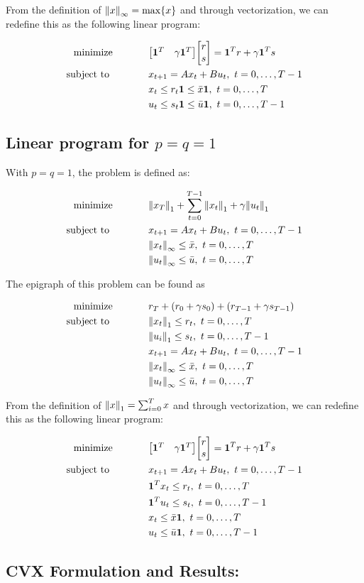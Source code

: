 \documentclass[letter]{article}
\newcommand{\optpblm}[3][eq:default]{
	\begin{equation}\label{#1}
		\begin{aligned}
			\text{minimize} \hspace{0.5in} &#2\vspace{5pt}\\
			\text{subject to \hspace{0.5in}} &#3
		\end{aligned}	
	\end{equation}
}
\begin{document}
From the definition of $\norm{x}_\infty = \max \{x\}$ and through vectorization, we can redefine this as the following linear program:
\optpblm{
	\mqty[\vb{1}^T & \gamma \vb{1}^T] \mqty[r\\s] 
	=\vb{1}^T r + \gamma \vb{1}^T s}{
	x_{t+1} = A x_t + B u_t, \ t = 0,\dots,T-1\\
	&x_t \leq r_t \vb{1} \leq \bar{x} \vb{1}, \ t = 0, \dots, T\\
	&u_t \leq s_t \vb{1} \leq \bar{u} \vb{1}, \ t = 0, \dots, T-1
	}


\subsection{Linear program for $p = q = 1$}
With $p = q = 1$, the problem is defined as:
\optpblm{\norm{x_T}_1 + \sum_{t = 0}^{T-1} \norm{x_t}_1 + \gamma\norm{u_t}_1}{
	x_{t+1} = A x_t + B u_t, \ t = 0,\dots,T-1\\
	& \norm{x_t}_\infty \leq \bar{x}, \ t = 0,\dots,T\\
	& \norm{u_t}_\infty \leq \bar{u}, \ t = 0,\dots,T}

The epigraph of this problem can be found as
\optpblm{r_T + (r_0 + \gamma s_0) + (r_{T-1} + \gamma s_{T-1})}{
	\norm{x_t}_1 \leq r_t, \ t = 0, \dots, T\\
	&\norm{u_i}_1 \leq s_t, \ t = 0, \dots, T-1\\
	&x_{t+1} = A x_t + B u_t, \ t = 0,\dots,T-1\\
	& \norm{x_t}_\infty \leq \bar{x}, \ t = 0,\dots,T\\
	& \norm{u_t}_\infty \leq \bar{u}, \ t = 0,\dots,T
}


From the definition of $\norm{x}_1 = \sum_{i=0}^T x$ and through vectorization, we can redefine this as the following linear program:
\optpblm{
	\mqty[\vb{1}^T & \gamma \vb{1}^T] \mqty[r\\s] 
	=\vb{1}^T r + \gamma \vb{1}^T s}{
	x_{t+1} = A x_t + B u_t, \ t = 0,\dots,T-1\\
	& \vb{1}^T x_t \leq r_t, \ t = 0,\dots,T\\
	& \vb{1}^T u_t \leq s_t, \ t = 0,\dots,T-1\\
	&x_t \leq \bar{x} \vb{1}, \ t = 0, \dots, T\\
	&u_t \leq \bar{u} \vb{1}, \ t = 0, \dots, T-1
}




\subsection{CVX Formulation and Results:}
\end{document}
